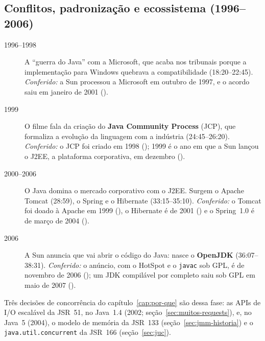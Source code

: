 \subsection{Conflitos, padronização e ecossistema (1996--2006)}
\begin{description}
\item[1996--1998] A \enquote{guerra do Java} com a Microsoft, que acaba
  nos tribunais porque a implementação para Windows quebrava a
  compatibilidade (18:20--22:45). \emph{Conferido:} a Sun processou a
  Microsoft em outubro de 1997, e o acordo saiu em janeiro de 2001
  ().
\item[1999] O filme fala da criação do \textbf{Java Community Process}
  (JCP), que formaliza a evolução da linguagem com a indústria
  (24:45--26:20). \emph{Conferido:} o JCP foi criado em 1998
  (); 1999 é o ano em que a Sun lançou o J2EE, a
  plataforma corporativa, em dezembro ().
\item[2000--2006] O Java domina o mercado corporativo com o J2EE. Surgem o
  Apache Tomcat (28:59), o Spring e o Hibernate (33:15--35:10).
  \emph{Conferido:} o Tomcat foi doado à Apache em 1999
  (), o Hibernate é de 2001
  () e o Spring~1.0 é de março
  de 2004 ().
\item[2006] A Sun anuncia que vai abrir o código do Java: nasce o
  \textbf{OpenJDK} (36:07--38:31). \emph{Conferido:} o anúncio, com o
  HotSpot e o \texttt{javac} sob GPL, é de novembro de 2006
  (); um JDK compilável por
  completo saiu sob GPL em maio de 2007
  ().
\end{description}
Três decisões de concorrência do capítulo~\ref{cap:por-que} são dessa
fase: as APIs de I/O escalável da JSR~51, no Java~1.4 (2002;
seção~\ref{sec:muitos-requests}), e, no Java~5 (2004), o modelo de
memória da JSR~133 (seção~\ref{sec:jmm-historia}) e o
\texttt{java.util.concurrent} da JSR~166 (seção~\ref{sec:juc}).

